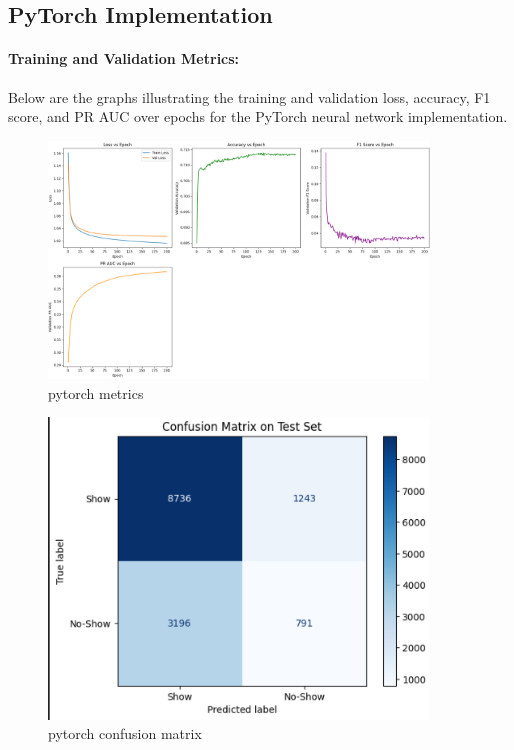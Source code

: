 \documentclass[12pt]{article}
\begin{document}
\subsection{PyTorch Implementation}

\paragraph{Training and Validation Metrics:}  
Below are the graphs illustrating the training and validation loss, accuracy, F1 score, and PR AUC over epochs for the PyTorch neural network implementation.

\begin{figure}[H]
    \centering
    \includegraphics[width=0.9\textwidth]{pytorch_metrics.png}
    \caption{pytorch metrics}
\end{figure}

\begin{figure}[H]
    \centering
    \includegraphics[width=0.9\textwidth]{pure_python_cm.png}
    \caption{pytorch confusion matrix}
\end{figure}
\end{document}
